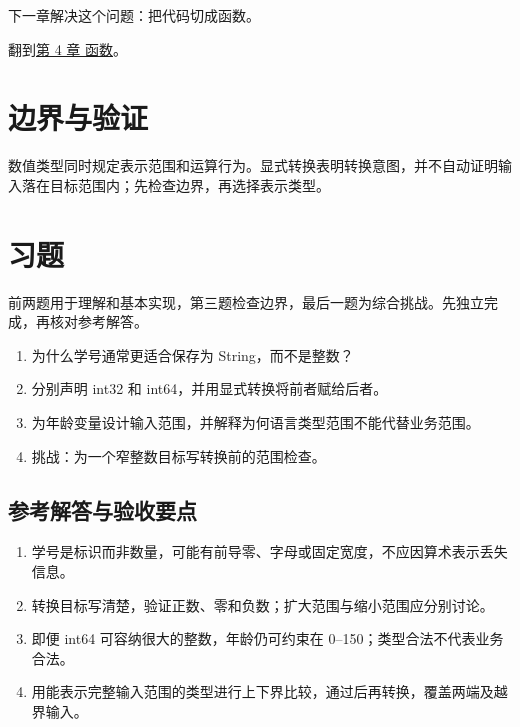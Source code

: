 下一章解决这个问题：把代码切成函数。

翻到\hyperref[ch:04]{第 4 章 函数}。

\section{边界与验证}

数值类型同时规定表示范围和运算行为。显式转换表明转换意图，并不自动证明输入落在目标范围内；先检查边界，再选择表示类型。

\section{习题}

前两题用于理解和基本实现，第三题检查边界，最后一题为综合挑战。先独立完成，再核对参考解答。

\begin{enumerate}

\item 为什么学号通常更适合保存为 String，而不是整数？

\item 分别声明 int32 和 int64，并用显式转换将前者赋给后者。

\item 为年龄变量设计输入范围，并解释为何语言类型范围不能代替业务范围。

\item 挑战：为一个窄整数目标写转换前的范围检查。

\end{enumerate}

\subsection*{参考解答与验收要点}

\begin{enumerate}

\item 学号是标识而非数量，可能有前导零、字母或固定宽度，不应因算术表示丢失信息。

\item 转换目标写清楚，验证正数、零和负数；扩大范围与缩小范围应分别讨论。

\item 即便 int64 可容纳很大的整数，年龄仍可约束在 0–150；类型合法不代表业务合法。

\item 用能表示完整输入范围的类型进行上下界比较，通过后再转换，覆盖两端及越界输入。

\end{enumerate}

